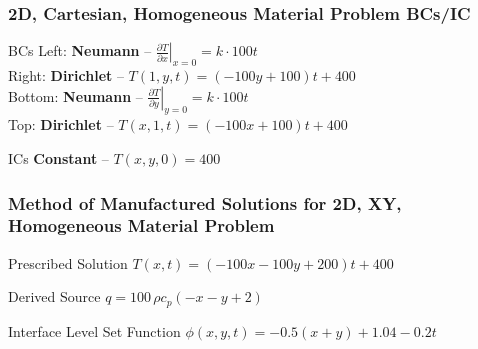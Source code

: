 \documentclass[]{beamer}
\begin{document}
\begin{frame}[t]\frametitle{2D, Cartesian, Homogeneous Material Problem BCs/IC}
  \begin{block}{BCs}
    Left: \textbf{Neumann} -- $\left. \frac{\partial T}{\partial x}\right|_{x=0} = k\cdot 100t$ \\
    Right: \textbf{Dirichlet} -- $T(1,y,t) = (-100y + 100)t +400$ \\
    Bottom: \textbf{Neumann} -- $\left. \frac{\partial T}{\partial y}\right|_{y=0} = k\cdot 100t$ \\
    Top: \textbf{Dirichlet} -- $T(x,1,t) = (-100x + 100)t + 400 $
  \end{block}
  
  \begin{block}{ICs}
    \textbf{Constant} -- $T(x,y,0) = 400$
  \end{block}
\end{frame}

\begin{frame}[t]\frametitle{Method of Manufactured Solutions for 2D, XY, Homogeneous Material Problem}
  \begin{block}{Prescribed Solution}
    $T(x,t) = (-100x-100y+200)t + 400$
  \end{block}
  
  \begin{block}{Derived Source}
  $q = 100\,\rho c_p \left(-x-y+2\right)$
  \end{block}
  
  \begin{block}{Interface Level Set Function}
    $\phi(x,y,t) = -0.5(x+y) + 1.04 - 0.2t$
  \end{block}
\end{frame}
\end{document}
